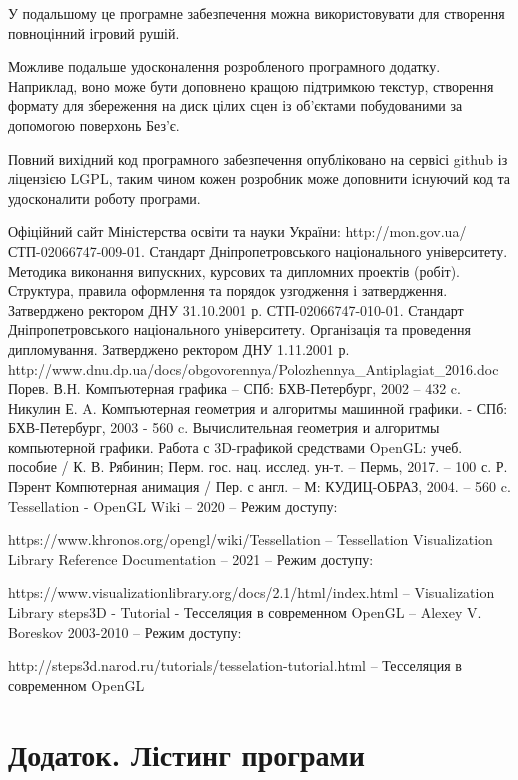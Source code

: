 \let\mypdfximage\pdfximage\def\pdfximage{\immediate\mypdfximage}\documentclass[14pt,a4paper]{extarticle}
\theoremstyle{definition}
\renewcommand{\[}{\begin{singlespace}\begin{equation*}}
\renewcommand{\]}{\end{equation*}\end{singlespace}}
\newcounter{rtaskno}
\newcommand{\rtask}[1]{\refstepcounter{rtaskno}\label{#1}}
\renewcommand{\+}{\discretionary{\mbox{\scriptsize$\hookleftarrow$}}{}{}}
\begin{document}
У подальшому це програмне забезпечення можна використовувати для створення повноцінний ігровий рушій. 

Можливе подальше удосконалення розробленого програмного додатку. Наприклад, воно може бути доповнено кращою підтримкою текстур, створення формату для збереження на диск цілих сцен із об'єктами побудованими за допомогою поверхонь Без'є.

Повний вихідний код програмного забезпечення опубліковано на сервісі github із ліцензією LGPL, таким чином кожен розробник може доповнити існуючий код та удосконалити роботу програми.

\begin{thebibliography}{9}
\bibitem{} Офіційний сайт Міністерства освіти та науки України: http://mon.gov.ua/
\bibitem{} СТП-02066747-009-01. Стандарт Дніпропетровського національного університету. Методика виконання випускних, курсових та дипломних проектів (робіт). Структура, правила оформлення та порядок узгодження і затвердження. Затверджено ректором ДНУ 31.10.2001 р.
\bibitem{} СТП-02066747-010-01. Стандарт Дніпропетровського національного університету. Організація та проведення дипломування. Затверджено ректором ДНУ 1.11.2001 р.
\bibitem{} http://www.dnu.dp.ua/docs/obgovorennya/Polozhennya\_Antiplagiat\_2016.doc
 Порев. В.Н. Компъютерная графика -- СПб: БХВ-Петербург, 2002 -- 432 c.
 Никулин Е. A. Компъютерная геометрия и алгоритмы машинной графики. - СПб: БХВ-Петербург, 2003 - 560 c.
 Вычислительная геометрия и алгоритмы компьютерной графики. Работа с 3D-графикой средствами OpenGL: учеб. пособие / К. В. Рябинин; Перм. гос. нац. исслед. ун-т. – Пермь, 2017. – 100 с.
 Р. Пэрент Компютерная анимация / Пер. с англ. -- М: КУДИЦ-ОБРАЗ, 2004. -- 560 c. 
 Tessellation - OpenGL Wiki -- 2020 -- Режим доступу:  

https://www.khronos.org/opengl/wiki/Tessellation -- Tessellation
 Visualization Library Reference Documentation -- 2021 -- Режим доступу:  

https://www.visualizationlibrary.org/docs/2.1/html/index.html -- Visualization Library
 steps3D - Tutorial - Тесселяция в современном OpenGL -- Alexey V. Boreskov 2003-2010 -- Режим доступу:  

http://steps3d.narod.ru/tutorials/tesselation-tutorial.html -- Тесселяция в современном OpenGL
\end{thebibliography}

\rtask{lastpage}
\section*{Додаток. Лістинг програми}
\small
\singlespacing














\end{document}
